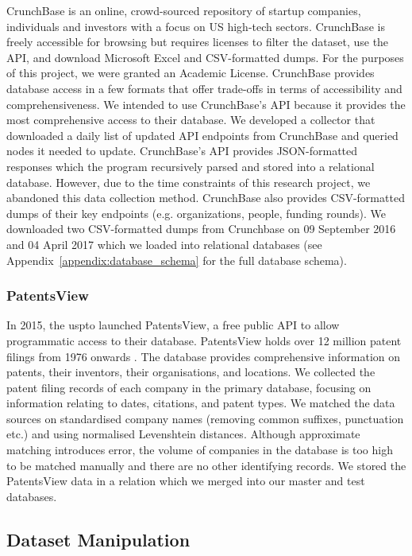 \documentclass[../thesis/thesis.tex]{subfiles}
\begin{document}
CrunchBase is an online, crowd-sourced repository of startup companies, individuals and investors with a focus on US high-tech sectors. CrunchBase is freely accessible for browsing but requires licenses to filter the dataset, use the API, and download Microsoft Excel and CSV-formatted dumps. For the purposes of this project, we were granted an Academic License. CrunchBase provides database access in a few formats that offer trade-offs in terms of accessibility and comprehensiveness. We intended to use CrunchBase's API because it provides the most comprehensive access to their database. We developed a collector that downloaded a daily list of updated API endpoints from CrunchBase and queried nodes it needed to update. CrunchBase's API provides JSON-formatted responses which the program recursively parsed and stored into a relational database. However, due to the time constraints of this research project, we abandoned this data collection method. CrunchBase also provides CSV-formatted dumps of their key endpoints (e.g. organizations, people, funding rounds). We downloaded two CSV-formatted dumps from Crunchbase on 09 September 2016 and 04 April 2017 which we loaded into relational databases (see Appendix~\ref{appendix:database_schema} for the full database schema).

\subsubsection{PatentsView}

In 2015, the \gls{uspto} launched PatentsView, a free public API to allow programmatic access to their database. PatentsView holds over 12 million patent filings from 1976 onwards \cite{schultz2016}. The database provides comprehensive information on patents, their inventors, their organisations, and locations. We collected the patent filing records of each company in the primary database, focusing on information relating to dates, citations, and patent types. We matched the data sources on standardised company names (removing common suffixes, punctuation etc.) and using normalised Levenshtein distances. Although approximate matching introduces error, the volume of companies in the database is too high to be matched manually and there are no other identifying records. We stored the PatentsView data in a relation which we merged into our master and test databases.

\subsection{Dataset Manipulation}
\end{document}
